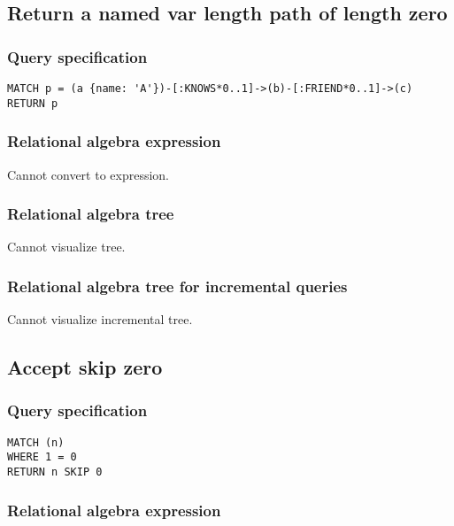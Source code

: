 \subsection{Return a named var length path of length zero}

\subsubsection*{Query specification}

\begin{lstlisting}
MATCH p = (a {name: 'A'})-[:KNOWS*0..1]->(b)-[:FRIEND*0..1]->(c)
RETURN p
\end{lstlisting}

\subsubsection*{Relational algebra expression}

Cannot convert to expression.

\subsubsection*{Relational algebra tree}

Cannot visualize tree.

\subsubsection*{Relational algebra tree for incremental queries}

Cannot visualize incremental tree.

\subsection{Accept skip zero}

\subsubsection*{Query specification}

\begin{lstlisting}
MATCH (n)
WHERE 1 = 0
RETURN n SKIP 0
\end{lstlisting}

\subsubsection*{Relational algebra expression}

